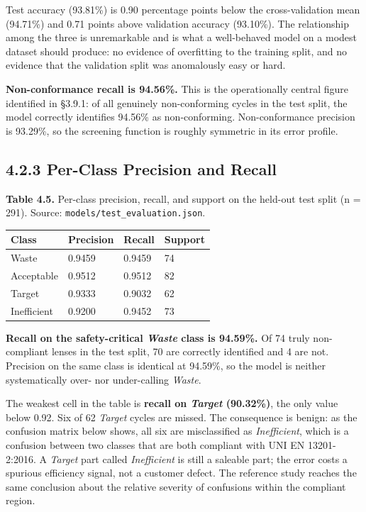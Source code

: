 Test accuracy (93.81\%) is 0.90 percentage points below the cross-validation mean (94.71\%) and 0.71 points above validation accuracy (93.10\%). The relationship among the three is unremarkable and is what a well-behaved model on a modest dataset should produce: no evidence of overfitting to the training split, and no evidence that the validation split was anomalously easy or hard.

\textbf{Non-conformance recall is 94.56\%.} This is the operationally central figure identified in §3.9.1: of all genuinely non-conforming cycles in the test split, the model correctly identifies 94.56\% as non-conforming. Non-conformance precision is 93.29\%, so the screening function is roughly symmetric in its error profile.

\hypertarget{per-class-precision-and-recall}{%
\subsection{4.2.3 Per-Class Precision and Recall}\label{per-class-precision-and-recall}}

\textbf{Table 4.5.} Per-class precision, recall, and support on the held-out test split (n = 291). Source: \texttt{models/test\_evaluation.json}.

\begin{longtable}[]{@{}llll@{}}
\toprule\noalign{}
Class & Precision & Recall & Support \\
\midrule\noalign{}
\endhead
\bottomrule\noalign{}
\endlastfoot
Waste & 0.9459 & 0.9459 & 74 \\
Acceptable & 0.9512 & 0.9512 & 82 \\
Target & 0.9333 & 0.9032 & 62 \\
Inefficient & 0.9200 & 0.9452 & 73 \\
\end{longtable}

\textbf{Recall on the safety-critical \emph{Waste} class is 94.59\%.} Of 74 truly non-compliant lenses in the test split, 70 are correctly identified and 4 are not. Precision on the same class is identical at 94.59\%, so the model is neither systematically over- nor under-calling \emph{Waste}.

The weakest cell in the table is \textbf{recall on \emph{Target} (90.32\%)}, the only value below 0.92. Six of 62 \emph{Target} cycles are missed. The consequence is benign: as the confusion matrix below shows, all six are misclassified as \emph{Inefficient}, which is a confusion between two classes that are both compliant with UNI EN 13201-2:2016. A \emph{Target} part called \emph{Inefficient} is still a saleable part; the error costs a spurious efficiency signal, not a customer defect. The reference study reaches the same conclusion about the relative severity of confusions within the compliant region.

